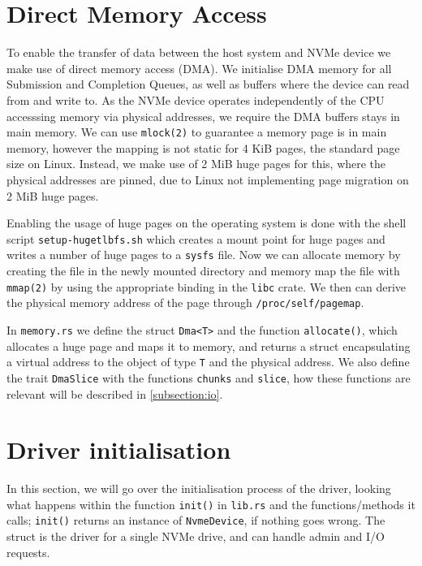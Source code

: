 \section{Direct Memory Access}
To enable the transfer of data between the host system and NVMe device we make use of direct memory access (DMA). We initialise DMA memory for all Submission and Completion Queues, as well as buffers where the device can read from and write to. As the NVMe device operates independently of the CPU accesssing memory via physical addresses, we require the DMA buffers stays in main memory. We can use \texttt{mlock(2)} to guarantee a memory page is in main memory, however the mapping is not static for 4 KiB pages, the standard page size on Linux. Instead, we make use of 2 MiB huge pages for this, where the physical addresses are pinned, due to Linux not implementing page migration on 2 MiB huge pages\cite{user_space_net}.

Enabling the usage of huge pages on the operating system is done with the shell script \texttt{setup-hugetlbfs.sh} which creates a mount point for huge pages and writes a number of huge pages to a \texttt{sysfs} file. Now we can allocate memory by creating the file in the newly mounted directory and memory map the file with \texttt{mmap(2)} by using the appropriate binding in the \texttt{libc} crate. We then can derive the physical memory address of the page through \texttt{/proc/self/pagemap}.

In \texttt{memory.rs} we define the struct \texttt{Dma<T>} and the function \texttt{allocate()}, which allocates a huge page and maps it to memory, and returns a struct encapsulating a virtual address to the object of type \texttt{T} and the physical address. We also define the trait \texttt{DmaSlice} with the functions \texttt{chunks} and \texttt{slice}, how these functions are relevant will be described in \autoref{subsection:io}.


\section{Driver initialisation}
In this section, we will go over the initialisation process of the driver, looking what happens within the function \texttt{init()} in \texttt{lib.rs} and the functions/methods it calls; \texttt{init()} returns an instance of \texttt{NvmeDevice}, if nothing goes wrong. The struct is the driver for a single NVMe drive, and can handle admin and I/O requests.

